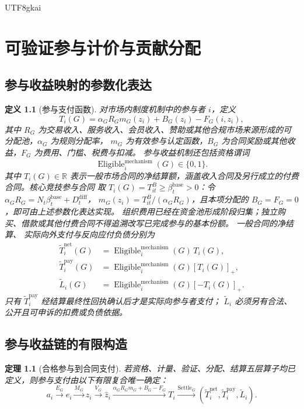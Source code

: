 \documentclass[12pt,a4paper,openany]{report}
\newtheorem{definition}{定义}[chapter]
\newtheorem{theorem}{定理}[chapter]
\newcommand{\RR}{\mathbb R}
\DeclareMathOperator{\Eligible}{Eligible}
\begin{document}
\begin{CJK*}{UTF8}{gkai}
\chapter{可验证参与计价与贡献分配}
\label{chap:platform-contribution}

\section{参与收益映射的参数化表达}

\begin{definition}[参与支付函数]
对市场内制度机制中的参与者 \(i\)，定义
\[
  T_i(G)
  =
  \alpha_G R_G m_G(z_i)
  +B_G(z_i)-F_G(i,z_i),
\]
其中 \(R_G\) 为交易收入、服务收入、会员收入、赞助或其他合规市场来源形成的可分配池，\(\alpha_G\) 为规则分配率，
\(m_G\) 为有效参与认定函数，\(B_G\) 为合同奖励或其他收益，\(F_G\) 为费用、门槛、税费与扣减。
参与收益机制还包括资格谓词
\[
  \Eligible_i^{\mathrm{mechanism}}(G)\in\{0,1\}.
\]
其中 \(T_i(G)\in\RR\) 表示一般市场合同的净结算额，涵盖收入合同及另行成立的付费合同。核心竞技参与合同
取 \(T_i(G)=T_{it}^B\ge\beta_t^{\mathrm{base}}>0\)：令 \(\alpha_GR_G=N_t\beta_t^{\mathrm{base}}+D_t^{\mathrm{diff}}\)，
\(m_G(z_i)=T_{it}^B/(\alpha_GR_G)\)，且本项分配的 \(B_G=F_G=0\)，即可由上述参数化表达实现。
组织费用已经在资金池形成阶段归集；独立购买、借款或其他付费合同不得追溯改写已完成参与的基本份额。
一般合同的净结算、
实际向外支付与反向应付负债分别为
\[
\begin{aligned}
  \widetilde T_i^{\mathrm{net}}(G)
  &=\Eligible_i^{\mathrm{mechanism}}(G)\,T_i(G),\\
  \widetilde T_i^{\mathrm{pay}}(G)
  &=\Eligible_i^{\mathrm{mechanism}}(G)[T_i(G)]_+,\\
  \widetilde L_i(G)
  &=\Eligible_i^{\mathrm{mechanism}}(G)[-T_i(G)]_+.
\end{aligned}
\]
只有 \(\widetilde T_i^{\mathrm{pay}}\) 经结算最终性回执确认后才是实际向参与者支付；
\(\widetilde L_i\) 必须另有合法、公开且可申诉的扣费或负债依据。
\end{definition}

\section{参与收益链的有限构造}

\begin{theorem}[合格参与到合同支付]
\label{thm:platform-payment-chain}
若资格、计量、验证、分配、结算五层算子均已定义，则参与支付由以下有限复合唯一确定：
\[
  a_i
  \xrightarrow{E_G}
  e_i
  \xrightarrow{M_G}
  z_i
  \xrightarrow{V_G}
  \widehat z_i
  \xrightarrow{\alpha_GR_Gm_G+B_G-F_G}
  T_i
  \xrightarrow{\operatorname{Settle}_G}
  (\widetilde T_i^{\mathrm{net}},\widetilde T_i^{\mathrm{pay}},\widetilde L_i).
\]
\end{theorem}


\end{CJK*}
\end{document}
